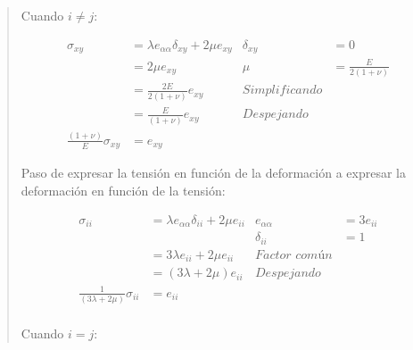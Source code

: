 \documentclass[a4paper,10pt,twoside,final,spanish]{article}
\begin{document}
\begin{quote}

\begin{tcolorbox}[colback=gray!10!white,colframe=black!0!white]

Cuando $i\neq j$:

\begin{align*}
\sigma_{xy} &= \lambda e_{\alpha\alpha}\delta_{xy}+2\mu e_{xy} & \delta_{xy} &= 0 \\
&= 2\mu e_{xy} & \mu &= \frac{E}{2(1+\nu)} \\
&= \frac{2E}{2(1+\nu)}e_{xy} & \textit{Simplificando} \\
&= \frac{E}{(1+\nu)}e_{xy} & \textit{Despejando} \\
\frac{(1+\nu)}{E}\sigma_{xy} &= e_{xy}
\end{align*}

\end{tcolorbox}

\begin{tcolorbox}[colback=gray!10!white,colframe=black!0!white]

Paso de expresar la tensión en función de la deformación a expresar la deformación en función de la tensión:

\begin{align*}
\sigma_{ii} &= \lambda e_{\alpha\alpha}\delta_{ii}+2\mu e_{ii}
& e_{\alpha\alpha} &= 3e_{ii} \\
&& \delta_{ii} &= 1 \\
&= 3\lambda e_{ii}+2\mu e_{ii} & \textit{Factor común} \\
&= (3\lambda+2\mu)e_{ii} & \textit{Despejando} \\
\frac{1}{(3\lambda+2\mu)}\sigma_{ii} &= e_{ii} \\
\end{align*}

\end{tcolorbox}

\begin{tcolorbox}[colback=gray!10!white,colframe=black!0!white]

Cuando $i=j$:


\end{tcolorbox}
\end{quote}
\end{document}
